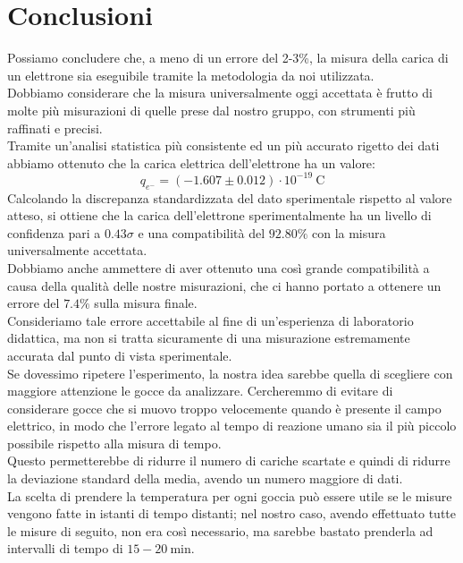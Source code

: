 \section{Conclusioni}
        Possiamo concludere che, a meno di un errore del 2-3\%, la misura della carica di un elettrone sia eseguibile tramite la metodologia da noi utilizzata.\\
        Dobbiamo considerare che la misura universalmente oggi accettata è frutto di molte più misurazioni di quelle prese dal nostro gruppo, con strumenti più raffinati e precisi.\\
        Tramite un'analisi statistica più consistente ed un più accurato rigetto dei dati abbiamo ottenuto che la carica elettrica dell'elettrone ha un valore:
        $$q_{e^-} = \left(-1.607\pm0.012\right)\cdot10^{-19}~\mathrm{C}$$
        Calcolando la discrepanza standardizzata del dato sperimentale rispetto al valore atteso, si ottiene che la carica dell'elettrone sperimentalmente ha un livello di confidenza pari a $0.43\sigma$ e una compatibilità del $92.80\%$ con la misura universalmente accettata.\\
        Dobbiamo anche ammettere di aver ottenuto una così grande compatibilità a causa della qualità delle nostre misurazioni, che ci hanno portato a ottenere un errore del $7.4\%$ sulla misura finale.\\
        Consideriamo tale errore accettabile al fine di un'esperienza di laboratorio didattica, ma non si tratta sicuramente di una misurazione estremamente accurata dal punto di vista sperimentale.\\
        Se dovessimo ripetere l'esperimento, la nostra idea sarebbe quella di scegliere con maggiore attenzione le gocce da analizzare. Cercheremmo di evitare di considerare gocce che si muovo troppo velocemente quando è presente il campo elettrico, in modo che l'errore legato al tempo di reazione umano sia il più piccolo possibile rispetto alla misura di tempo.\\
        Questo permetterebbe di ridurre il numero di cariche scartate e quindi di ridurre la deviazione standard della media, avendo un numero maggiore di dati.\\
        La scelta di prendere la temperatura per ogni goccia può essere utile se le misure vengono fatte in istanti di tempo distanti; nel nostro caso, avendo effettuato tutte le misure di seguito, non era così necessario, ma sarebbe bastato prenderla ad intervalli di tempo di $15-20~\mathrm{min}$.\\
        